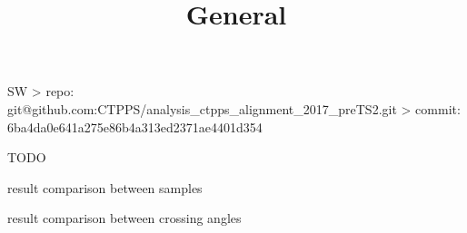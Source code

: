 


\newpage %

\def\author{J.~Kašpar}
\def\caption{CTPPS alignment 2017 pre-TS2}
\def\date{\the\year/\the\month/\the\day}

\let\NormalFonts\SetFontSizesX

\newpage %
\title{General}

\> SW
\>> repo: git@github.com:CTPPS/analysis\_ctpps\_alignment\_2017\_preTS2.git
\>> commit: 6ba4da0e641a275e86b4a313ed2371ae4401d354

\> TODO

\iffalse
\> input data
\>> alignment runs:\\ /eos/totem/data/ctpps/reconstruction/2017/alignment\_run\_September/version7
\>> physics runs:\\ /eos/totem/data/ctpps/reconstruction/2017/postTS2\_alignment\_data/version5
\>>> from Run2017E-17Nov2017-v1/AOD and Run2017F-17Nov2017-v1/AOD

\> re-reco performed with\\
/afs/cern.ch/work/j/jkaspar/software/ctpps/development/uniform\_pixel\_reco\_2017/CMSSW\_10\_2\_0
\>> pixel tracks only build with planes that did not change settings during the post-TS2 period
\>>> sector 45: used only planes 0, 2 and 4
\>>> sector 56: used only planes 0, 1 and 3
\fi

\newpage %

\centerline{}

\newpage %

\> result comparison between samples

\centerline{}

\newpage %

\> result comparison between crossing angles

\centerline{}



